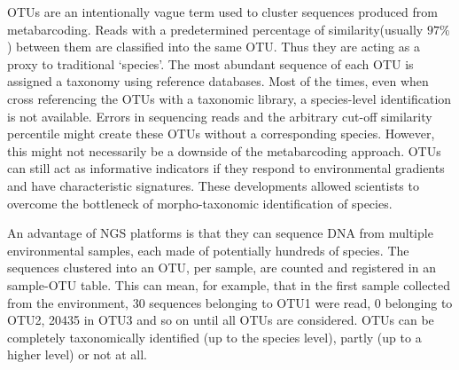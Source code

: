 OTUs are an intentionally vague term used to cluster sequences produced from  metabarcoding. Reads with a predetermined percentage of similarity(usually $97\%$) between them are classified into the same OTU. Thus they are acting as a proxy to traditional `species'. The most abundant sequence of each OTU is assigned a taxonomy using reference databases. Most of the times, even when cross referencing the OTUs with a taxonomic library, a species-level identification is not available. Errors in sequencing reads and the arbitrary cut-off similarity percentile might create these OTUs without a corresponding species. However, this might not necessarily be a downside of the metabarcoding approach. OTUs can still act as informative indicators if they respond to environmental gradients and have characteristic signatures. 
These developments allowed scientists to overcome the bottleneck of morpho-taxonomic identification of species. 


An advantage of NGS platforms is that they can sequence DNA from multiple environmental samples, each made of potentially hundreds of species. The sequences clustered into an OTU, per sample, are counted and registered in an sample-OTU table. This can mean, for example, that in the first sample collected from the environment, 30 sequences belonging to OTU1 were read, 0 belonging to OTU2, 20435 in OTU3 and so on until all OTUs are considered. OTUs can be completely taxonomically identified (up to the species level), partly (up to a higher level) or not at all. 




